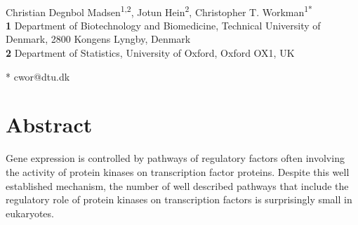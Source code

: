 \documentclass[10pt,letterpaper]{article}
\begin{document}
\vspace*{0.2in}

\begin{flushleft}
{\Large
\textbf{} %
}
\newline
\\
Christian Degnbol Madsen\textsuperscript{1,2},
Jotun Hein\textsuperscript{2},
Christopher T. Workman\textsuperscript{1*}
\\
\bigskip
\textbf{1} Department of Biotechnology and Biomedicine, Technical University of Denmark, 2800 Kongens Lyngby, Denmark
\\
\textbf{2} Department of Statistics, University of Oxford, Oxford OX1, UK
\\
\bigskip

* cwor@dtu.dk

\end{flushleft}
\section*{Abstract}

Gene expression is controlled by pathways of regulatory factors often involving the activity of protein kinases on transcription factor proteins.
Despite this well established mechanism, the number of well described pathways that include the regulatory role of protein kinases on transcription factors is surprisingly small in eukaryotes.
\end{document}
